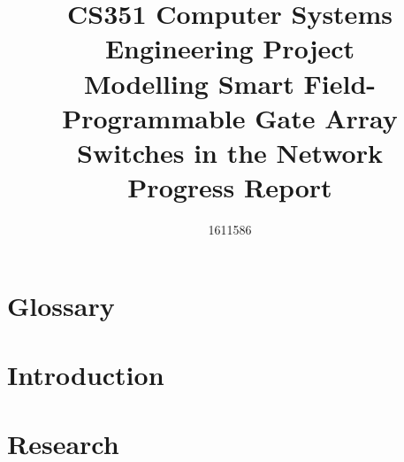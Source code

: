 \documentclass[
  12pt,
  a4paper,
  twoside,
  onecolumn,
  appendixprefix=true,
  toc=chapterentrywithdots,
  toc=bibliography,
  abstract=true,
  toc=listof
]{scrreprt}
\title{CS351 Computer Systems Engineering Project \\ \vspace{0.5cm} Modelling Smart Field-Programmable Gate Array Switches in the Network \\ \vspace{0.3cm} \Large{Progress Report}}
\author{1611586}
\begin{document}
\renewcommand{\sfdefault}{cmr}



\let\oldcleardoublepage\cleardoublepage
\let\cleardoublepage\clearpage



\onehalfspacing

\begin{abstract}
  
\end{abstract}


\renewcommand{\abstractname}{Keywords}
\begin{abstract}
  
\end{abstract}

\renewcommand{\abstractname}{Acknowledgements}
\begin{abstract}
  
\end{abstract}

\let\cleardoublepage\oldcleardoublepage

\tableofcontents

\listoffigures

\listoftables

{}
\chapter*{Glossary}
\label{glossary}


\newpage


\chapter{Introduction}
\label{introduction}


\chapter{Research}
\label{research}

\end{document}

